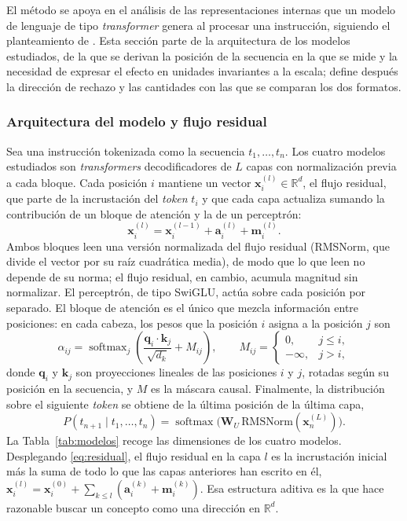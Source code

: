El método se apoya en el análisis de las representaciones internas que un modelo de lenguaje de tipo \textit{transformer} genera al procesar una instrucción, siguiendo el planteamiento de \textcite{arditi2024}. Esta sección parte de la arquitectura de los modelos estudiados, de la que se derivan la posición de la secuencia en la que se mide y la necesidad de expresar el efecto en unidades invariantes a la escala; define después la dirección de rechazo y las cantidades con las que se comparan los dos formatos.

\subsubsection*{Arquitectura del modelo y flujo residual}

Sea una instrucción tokenizada como la secuencia $t_1, \dots, t_n$. Los cuatro modelos estudiados son \textit{transformers} decodificadores de $L$ capas con normalización previa a cada bloque. Cada posición $i$ mantiene un vector $\bm{x}_i^{(l)} \in \mathbb{R}^{d}$, el flujo residual, que parte de la incrustación del \textit{token} $t_i$ y que cada capa actualiza sumando la contribución de un bloque de atención y la de un perceptrón:
\begin{equation}
\bm{x}_i^{(l)} = \bm{x}_i^{(l-1)} + \bm{a}_i^{(l)} + \bm{m}_i^{(l)}.
\label{eq:residual}
\end{equation}
Ambos bloques leen una versión normalizada del flujo residual (RMSNorm, que divide el vector por su raíz cuadrática media), de modo que lo que leen no depende de su norma; el flujo residual, en cambio, acumula magnitud sin normalizar. El perceptrón, de tipo SwiGLU, actúa sobre cada posición por separado. El bloque de atención es el único que mezcla información entre posiciones: en cada cabeza, los pesos que la posición $i$ asigna a la posición $j$ son
\begin{equation}
\alpha_{ij} = \operatorname{softmax}_{j}\!\left( \frac{\bm{q}_i \cdot \bm{k}_j}{\sqrt{d_k}} + M_{ij} \right),
\qquad
M_{ij} =
\begin{cases}
0, & j \le i,\\[2pt]
-\infty, & j > i,
\end{cases}
\label{eq:atencion}
\end{equation}
donde $\bm{q}_i$ y $\bm{k}_j$ son proyecciones lineales de las posiciones $i$ y $j$, rotadas según su posición en la secuencia, y $M$ es la máscara causal. Finalmente, la distribución sobre el siguiente \textit{token} se obtiene de la última posición de la última capa,
\begin{equation}
P(t_{n+1} \mid t_1, \dots, t_n) = \operatorname{softmax}\!\big( \bm{W}_U\, \mathrm{RMSNorm}(\bm{x}_n^{(L)}) \big).
\label{eq:unembedding}
\end{equation}
La Tabla~\ref{tab:modelos} recoge las dimensiones de los cuatro modelos. Desplegando \eqref{eq:residual}, el flujo residual en la capa $l$ es la incrustación inicial más la suma de todo lo que las capas anteriores han escrito en él, $\bm{x}_i^{(l)} = \bm{x}_i^{(0)} + \sum_{k \le l} (\bm{a}_i^{(k)} + \bm{m}_i^{(k)})$. Esa estructura aditiva es la que hace razonable buscar un concepto como una dirección en $\mathbb{R}^{d}$.

